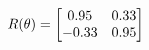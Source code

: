 \documentclass[preview]{standalone}
\begin{document}
\begin{align*}
\special{dvisvgm:raw <g id='unique000'>}R(\theta) = \begin{bmatrix}0.95 & 0.33\\-0.33 & 0.95\end{bmatrix}\special{dvisvgm:raw </g>}
\end{align*}
\end{document}
